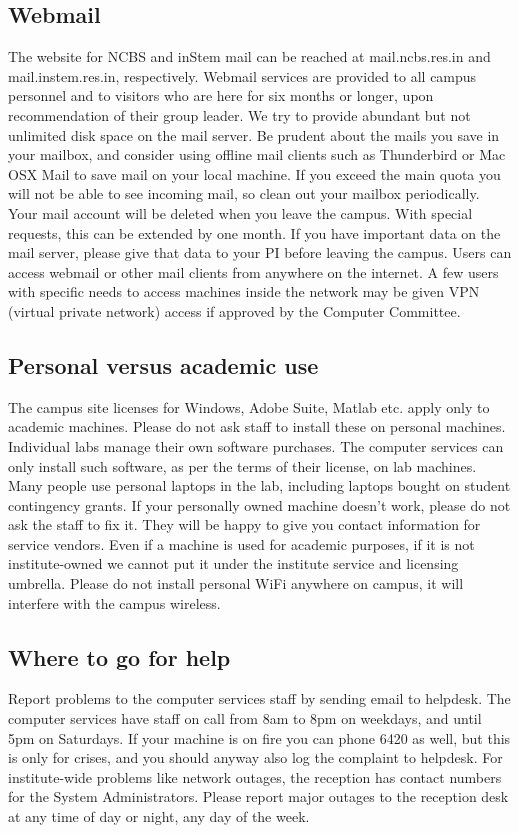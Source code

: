 \documentclass[a4paper,10pt]{article}
\begin{document}
\subsection{Webmail}
The website for NCBS and inStem mail can be reached at mail.ncbs.res.in and
mail.instem.res.in, respectively. Webmail services are provided to all campus personnel
and to visitors who are here for six months or longer, upon recommendation of their group
leader. We try to provide abundant but not unlimited disk space on the mail server. Be
prudent about the mails you save in your mailbox, and consider using offline mail clients
such as Thunderbird or Mac OSX Mail to save mail on your local machine. If you exceed
the main quota you will not be able to see incoming mail, so clean out your mailbox
periodically. Your mail account will be deleted when you leave the campus. With special
requests, this can be extended by one month. If you have important data on the mail server,
please give that data to your PI before leaving the campus. Users can access webmail or
other mail clients from anywhere on the internet. A few users with specific needs to access
machines inside the network may be given VPN (virtual private network) access if approved
by the Computer Committee.


\subsection{Personal versus academic use}
The campus site licenses for Windows, Adobe Suite,
Matlab etc. apply only to academic machines. Please do not ask staff to install these on
personal machines. Individual labs manage their own software purchases. The computer
services can only install such software, as per the terms of their license, on lab machines.
Many people use personal laptops in the lab, including laptops bought on student
contingency grants. If your personally owned machine doesn’t work, please do not ask the
staff to fix it. They will be happy to give you contact information for service vendors. Even
if a machine is used for academic purposes, if it is not institute-owned we cannot put it
under the institute service and licensing umbrella. Please do not install personal WiFi
anywhere on campus, it will interfere with the campus wireless.

\subsection{Where to go for help}
Report problems to the computer services staff by sending email to
helpdesk. The computer services have staff on call from 8am to 8pm on weekdays, and until
5pm on Saturdays. If your machine is on fire you can phone 6420 as well, but this is only for
crises, and you should anyway also log the complaint to helpdesk. For institute-wide
problems like network outages, the reception has contact numbers for the System
Administrators. Please report major outages to the reception desk at any time of day or
night, any day of the week.
\end{document}
